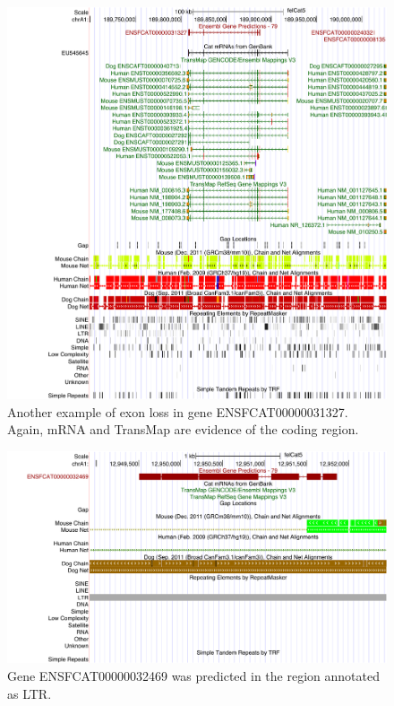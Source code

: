 \documentclass{article}
\begin{document}
\begin{figure}[h]
\centering
\includegraphics[width=\textwidth]{images/hgt_hgwdev_ed86_52bfa0.pdf}
\caption{Another example of exon loss in gene ENSFCAT00000031327. Again, mRNA and TransMap are evidence of the coding region.}
\label{fig:missed_exons_mrna_2}
\end{figure}

\begin{figure}[h]
\centering
\includegraphics[width=\textwidth]{images/hgt_hgwdev_ede4_52c4e0.pdf}
\caption{Gene ENSFCAT00000032469 was predicted in the region annotated as LTR.}
\label{fig:gene_in_ltr}
\end{figure}
\end{document}

